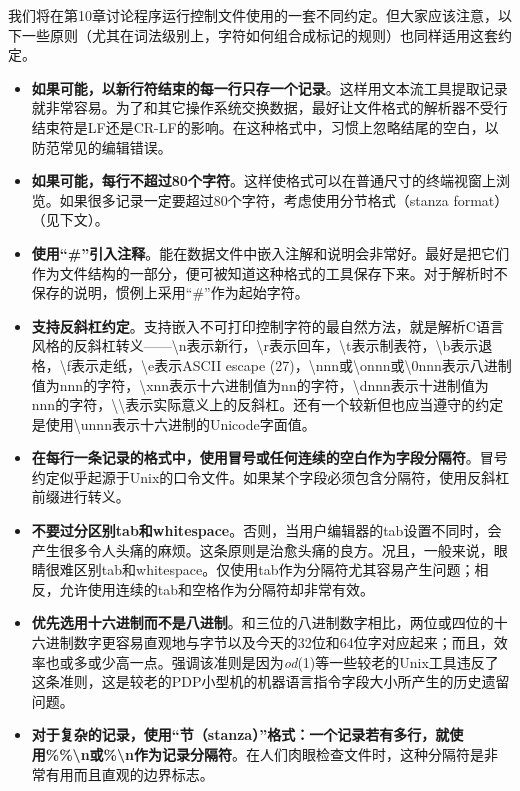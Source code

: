 \documentclass[12pt,oneside]{book}
\begin{document}
我们将在第10章讨论程序运行控制文件使用的一套不同约定。但大家应该注意，以下一些原则（尤其在词法级别上，字符如何组合成标记的规则）也同样适用这套约定。
\begin{itemize}
\item \textbf{如果可能，以新行符结束的每一行只存一个记录}。这样用文本流工具提取记录就非常容易。为了和其它操作系统交换数据，最好让文件格式的解析器不受行结束符是LF还是CR-LF的影响。在这种格式中，习惯上忽略结尾的空白，以防范常见的编辑错误。
\item  \textbf{如果可能，每行不超过80个字符}。这样使格式可以在普通尺寸的终端视窗上浏览。如果很多记录一定要超过80个字符，考虑使用分节格式（stanza format）（见下文）。
\item \textbf{使用“\#{}”引入注释}。能在数据文件中嵌入注解和说明会非常好。最好是把它们作为文件结构的一部分，便可被知道这种格式的工具保存下来。对于解析时不保存的说明，惯例上采用“\#{}”作为起始字符。
\item \textbf{支持反斜杠约定}。支持嵌入不可打印控制字符的最自然方法，就是解析C语言风格的反斜杠转义——\textbackslash{}n表示新行，\textbackslash{}r表示回车，\textbackslash{}t表示制表符，\textbackslash{}b表示退格，\textbackslash{}f表示走纸，\textbackslash{}e表示ASCII escape (27)，\textbackslash{}nnn或\textbackslash{}onnn或\textbackslash{}0nnn表示八进制值为nnn的字符，\textbackslash{}xnn表示十六进制值为nn的字符，\textbackslash{}dnnn表示十进制值为nnn的字符，\textbackslash{}\textbackslash{}表示实际意义上的反斜杠。还有一个较新但也应当遵守的约定是使用\textbackslash{}unnn表示十六进制的Unicode字面值。
\item \textbf{在每行一条记录的格式中，使用冒号或任何连续的空白作为字段分隔符}。冒号约定似乎起源于Unix的口令文件。如果某个字段必须包含分隔符，使用反斜杠前缀进行转义。
\item \textbf{不要过分区别tab和whitespace}。否则，当用户编辑器的tab设置不同时，会产生很多令人头痛的麻烦。这条原则是治愈头痛的良方。况且，一般来说，眼睛很难区别tab和whitespace。仅使用tab作为分隔符尤其容易产生问题；相反，允许使用连续的tab和空格作为分隔符却非常有效。
\item \textbf{优先选用十六进制而不是八进制}。和三位的八进制数字相比，两位或四位的十六进制数字更容易直观地与字节以及今天的32位和64位字对应起来；而且，效率也或多或少高一点。强调该准则是因为\textit{od}(1)等一些较老的Unix工具违反了这条准则，这是较老的PDP小型机的机器语言指令字段大小所产生的历史遗留问题。
\item \textbf{对于复杂的记录，使用“节（stanza）”格式：一个记录若有多行，就使用\%{}\%{}\textbackslash{}n或\%{}\textbackslash{}n作为记录分隔符}。在人们肉眼检查文件时，这种分隔符是非常有用而且直观的边界标志。

\end{itemize}
\end{document}
